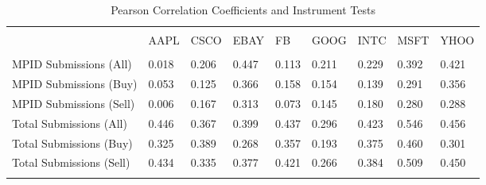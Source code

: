 \documentclass{article}
\begin{document}
\begin{table}[]
\centering
\caption{Pearson Correlation Coefficients and Instrument Tests}
\label{pearson}
\begin{tabular}{lllllllll} \hline \\
 & AAPL                & CSCO  & EBAY  & FB    & GOOG  & INTC  & MSFT  & YHOO       \\ \hline \\
MPID Submissions (All)     & 0.018 & 0.206 & 0.447 & 0.113 & 0.211 & 0.229 & 0.392 & 0.421 \\
MPID Submissions (Buy)  & 0.053 & 0.125 & 0.366 & 0.158 & 0.154 & 0.139 & 0.291 & 0.356 \\
MPID Submissions (Sell) & 0.006 & 0.167 & 0.313 & 0.073 & 0.145 & 0.180 & 0.280 & 0.288 \\
Total Submissions (All)        & 0.446 & 0.367 & 0.399 & 0.437 & 0.296 & 0.423 & 0.546 & 0.456 \\
Total Submissions (Buy)         & 0.325 & 0.389 & 0.268 & 0.357 & 0.193 & 0.375 & 0.460 & 0.301 \\
Total Submissions (Sell)        & 0.434 & 0.335 & 0.377 & 0.421 & 0.266 & 0.384 & 0.509 & 0.450 \\ \\ \hline
\end{tabular}
\end{table}
\end{document}
